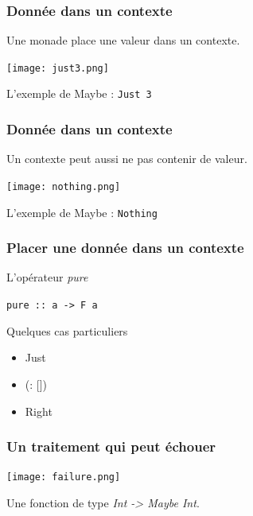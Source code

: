 \documentclass{beamer}
\begin{document}
\begin{frame}
\frametitle{Donnée dans un contexte}

\begin{block}{}
Une monade place une valeur dans un contexte.
\end{block}

\begin{center}
\texttt{[image: just3.png]}
\end{center}

\begin{exampleblock}{}
L'exemple de Maybe : \verb!Just 3!
\end{exampleblock}
\end{frame}

\begin{frame}
\frametitle{Donnée dans un contexte}

\begin{block}{}
Un contexte peut aussi ne pas contenir de valeur.
\end{block}

\begin{center}
\texttt{[image: nothing.png]}
\end{center}
\begin{exampleblock}{}
L'exemple de Maybe : \verb!Nothing!
\end{exampleblock}
\end{frame}

\begin{frame}
\frametitle{Placer une donnée dans un contexte}

\begin{block}{L'opérateur \emph{pure}}
\begin{center}
\verb!pure :: a -> F a!
\end{center}
\end{block}

\begin{exampleblock}{Quelques cas particuliers}
	\begin{itemize}
		\item Just
		\item (: [])
		\item Right
	\end{itemize}
\end{exampleblock}
\end{frame}


\begin{frame}
\frametitle{Un traitement qui peut échouer}

\begin{center}
\texttt{[image: failure.png]}
\end{center}
\begin{exampleblock}{}
Une fonction de type \emph{Int -> Maybe Int}.
\end{exampleblock}
\end{frame}
\end{document}

